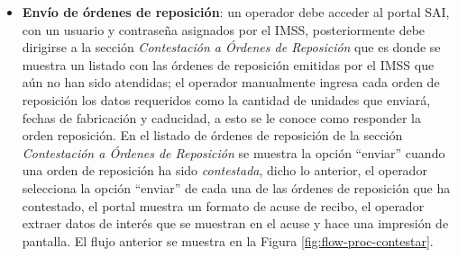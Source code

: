 \documentclass[a4paper,10pt]{article}
\begin{document}
\begin{itemize}
\item \textbf{Envío de órdenes de reposición}: un operador debe acceder al portal SAI, con un usuario y contraseña asignados por el IMSS, posteriormente debe dirigirse a la sección \textit{Contestación a Órdenes de Reposición} que es donde se muestra un listado con las órdenes de reposición emitidas por el IMSS que aún no han sido atendidas; el operador manualmente ingresa cada orden de reposición los datos requeridos como la cantidad de unidades que enviará, fechas de fabricación y caducidad, a esto se le conoce como responder la orden reposición. En el listado de órdenes de reposición de la sección \textit{Contestación a Órdenes de Reposición} se muestra la opción ``enviar'' cuando una orden de reposición ha sido \textit{contestada}, dicho lo anterior, el operador selecciona la opción ``enviar'' de cada una de las órdenes de reposición que ha contestado, el portal muestra un formato de acuse de recibo, el operador extraer datos de interés que se muestran en el acuse y hace una impresión de pantalla. El flujo anterior se muestra en la Figura \ref{fig:flow-proc-contestar}.


\end{itemize}
\end{document}
